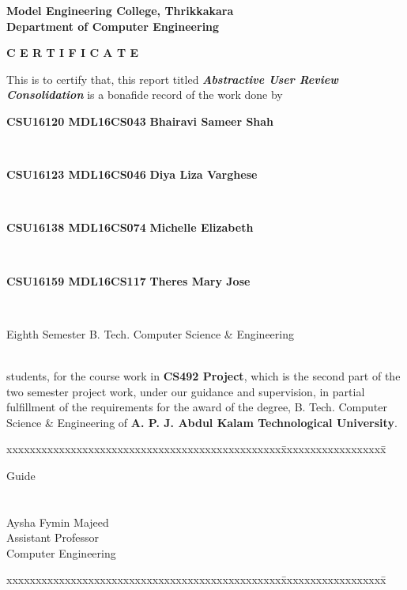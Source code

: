 \documentclass[11pt]{report}
\begin{document}
\begin{titlepage}
\begin{center}
\Large{\textbf{Model Engineering College, Thrikkakara}}\\
\Large{\textbf{Department of Computer Engineering}}\\
\end{center}
\begin{figure}[h]
\begin{center}
\end{center}
\end{figure}
\begin{center}
\Large{\textbf{C E R T I F I C A T E}}\\
\vspace{.1in}
\end{center}
This is to certify that, this report titled \textbf{\textit{Abstractive User Review Consolidation}} is a bonafide record of the work done by \vspace{.1in}\\
\centerline{\Large{\textbf{CSU16120 MDL16CS043}	\hspace{.1in} 
\Large{\textbf{Bhairavi Sameer Shah}}}}\\
\centerline{\Large{\textbf{CSU16123 MDL16CS046}	\hspace{.1in}	\Large{\textbf{Diya Liza Varghese}}}}\\
\centerline{\Large{\textbf{CSU16138 MDL16CS074}	\hspace{.1in}	\Large{\textbf{Michelle Elizabeth}}}}\\
\centerline{\Large{\textbf{CSU16159 MDL16CS117}	\hspace{.1in}	\Large{\textbf{Theres Mary Jose}}}}\vspace{.1in}\\
\centerline {\textsf{Eighth Semester B. Tech. Computer Science \& Engineering}}\\
students,  for the course work in \textbf{CS492 Project}, which is the second part of the two semester project work, under our guidance and supervision, in partial 
 fulfillment of the requirements for the award of the degree, B. Tech. Computer 
Science \& Engineering of \textbf{A. P. J. Abdul Kalam Technological University}.
\vspace{.1in}
\begin{tabbing}
xxxxxxxxxxxxxxxxxxxxxxxxxxxxxxxxxxxxxxxxxxxxxxx\= xxxxxxxxxxxxxxxxxx\= \kill

Guide		\>				
\\
\\
\\
Aysha Fymin Majeed \>\>\\
Assistant Professor	\>\>\\
Computer Engineering	\>\>	
\end{tabbing}
\vspace{.1in}
\begin{tabbing}
xxxxxxxxxxxxxxxxxxxxxxxxxxxxxxxxxxxxxxxxxxxxxxx\= xxxxxxxxxxxxxxxxxx\= \kill


\end{tabbing}
\end{titlepage}
\end{document}
